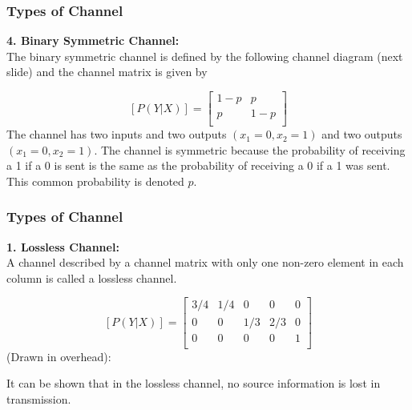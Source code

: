 \documentclass[a4]{beamer}
\begin{document}
\begin{frame}
\frametitle{Types of Channel}
\textbf{4. Binary Symmetric Channel:}\\
The binary symmetric channel is defined by the following channel diagram (next slide) and the channel matrix is given by

\[  [P(Y|X)]  = \left[ \begin{array}{cc}
1-p & p  \\
p & 1-p\\
\end{array} \right] \]
The channel has two inputs and two outputs $(x_1=0,x_2=1)$ and two outputs $(x_1=0,x_2=1)$. The channel is symmetric because the probability of receiving a 1 if a 0 is sent is the same as the probability of receiving a 0 if a 1 was sent. This common probability is denoted $p$.
\end{frame}



\begin{frame}
\frametitle{Types of Channel}
\textbf{ 1. Lossless Channel:}\\
A channel described by a channel matrix with only one non-zero element in each column is called a lossless channel.


\[  [P(Y|X)]  =  \left[ \begin{array}{ccccc}
3/4 & 1/4 &0 & 0&0\\
0  & 0 &1/3 & 2/3& 0\\
0  & 0& 0&0 &1 \\
\end{array} \right]  \]
(Drawn in overhead):\\ \bigskip

It can be shown that in the lossless channel, no source information is lost in transmission.
\end{frame}
\end{document}
